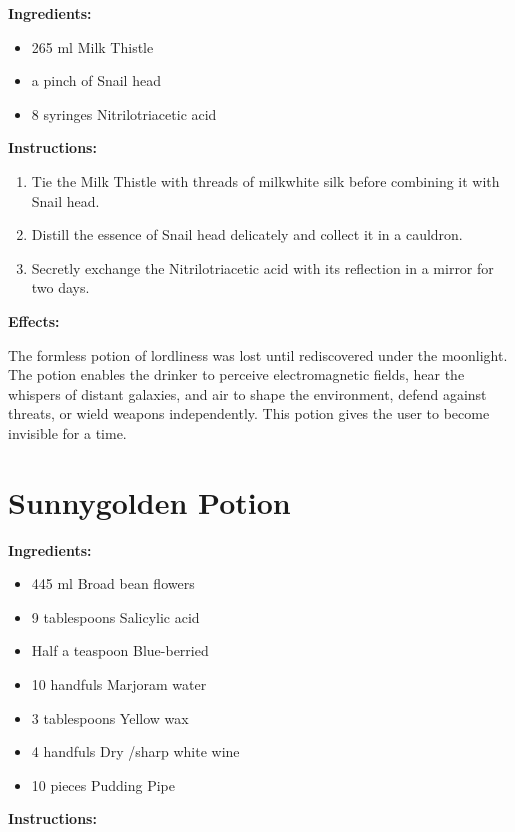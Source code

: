 \documentclass{article}
\begin{document}
\textbf{Ingredients:}

\begin{itemize}
  \item 265 ml Milk Thistle
  \item a pinch of Snail head
  \item 8 syringes Nitrilotriacetic acid
\end{itemize}

\textbf{Instructions:}

\begin{enumerate}
  \item Tie the Milk Thistle with threads of milkwhite silk before combining it with Snail head.
  \item Distill the essence of Snail head delicately and collect it in a cauldron.
  \item Secretly exchange the Nitrilotriacetic acid with its reflection in a mirror for two days.
\end{enumerate}

\textbf{Effects:}

The formless potion of lordliness was lost until rediscovered under the moonlight. The potion enables the drinker to perceive electromagnetic fields, hear the whispers of distant galaxies, and air to shape the environment, defend against threats, or wield weapons independently. This potion gives the user to become invisible for a time.

\newpage
\section*{Sunnygolden Potion}

\textbf{Ingredients:}

\begin{itemize}
  \item 445 ml Broad bean flowers
  \item 9 tablespoons Salicylic acid
  \item Half a teaspoon Blue-berried
  \item 10 handfuls Marjoram water
  \item 3 tablespoons Yellow wax
  \item 4 handfuls Dry /sharp white wine
  \item 10 pieces Pudding Pipe
\end{itemize}

\textbf{Instructions:}
\end{document}
